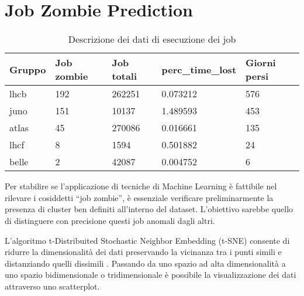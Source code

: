 \section{Job Zombie Prediction}







\begin{table}[!h]
    \centering
    \caption{Descrizione dei dati di esecuzione dei job}
    \begin{tabular}{lllll}
        \toprule
        \textbf{Gruppo} & \textbf{Job zombie} & \textbf{Job totali} &
        \textbf{perc\_time\_lost} & \textbf{Giorni persi} \\
        \midrule
        lhcb & 192 & 262251 & 0.073212 & 576 \\
        juno & 151 & 10137 & 1.489593 & 453 \\
        atlas & 45 & 270086 & 0.016661 & 135 \\
        lhcf & 8 & 1594 & 0.501882 & 24 \\
        belle & 2 & 42087 & 0.004752 & 6 \\
        \bottomrule
    \end{tabular}
    \label{table:job_zombie_timelost}
\end{table}




Per stabilire se l'applicazione di tecniche di Machine Learning è fattibile
nel rilevare i cosiddetti ``job zombie'', è essenziale verificare
preliminarmente la presenza di cluster ben definiti all'interno del dataset.
L'obiettivo sarebbe quello di distinguere con precisione questi job anomali
dagli altri. 

L'algoritmo t-Distribuited Stochastic Neighbor Embedding (t-SNE) consente di
ridurre la dimensionalità dei dati preservando la vicinanza tra i punti simili
e distanziando quelli dissimili \cite{geron2019}. Passando da uno spazio ad alta
dimensionalità a uno spazio bidimensionale o tridimensionale è possibile la
visualizzazione dei dati attraverso uno scatterplot.

